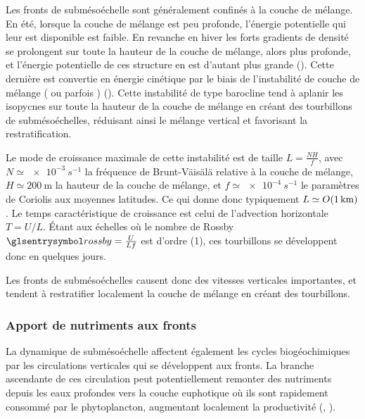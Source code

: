 Les fronts de submésoéchelle sont généralement confinés à la couche de mélange.
En été, lorsque la couche de mélange est peu profonde, l'énergie potentielle qui leur est disponible est faible.
En revanche en hiver les forts gradients de densité se prolongent sur toute la hauteur de la couche de mélange, alors plus profonde, et l'énergie potentielle de ces structure en est d'autant plus grande (\cite{mensa_2013,callies_2015,buckingham_2016,sasaki_2020}).
Cette dernière est convertie en énergie cinétique par le biais de l'instabilité de couche de mélange ( ou parfois ) (\cite{boccaletti_2007,fox-kemper_2008}).
Cette instabilité de type barocline tend à aplanir les isopycnes sur toute la hauteur de la couche de mélange en créant des tourbillons de submésoéchelles, réduisant ainsi le mélange vertical et favorisant la restratification.

\begin{note}
  Le mode de croissance maximale de cette instabilité est de taille \(L = \frac{NH}{f}\), avec \(N \simeq \qty{e-3}{s^{-1}}\) la fréquence de Brunt-Väisälä relative à la couche de mélange, \(H \simeq \qty{200}{\meter}\) la hauteur de la couche de mélange, et \(f \simeq \qty{e-4}{s^{-1}}\) le paramètres de Coriolis aux moyennes latitudes.
  Ce qui donne donc typiquement \(L \simeq \OM(\qty{1}{\km})\).
  Le temps caractéristique de croissance est celui de l'advection horizontale \(T = U/L\). Étant aux échelles où le nombre de Rossby \(\am{rossby} = \frac{U}{Lf}\) est d'ordre \OM(1), ces tourbillons se développent donc en quelques jours.
\end{note}

Les fronts de submésoéchelles causent donc des vitesses verticales importantes, et tendent à restratifier localement la couche de mélange en créant des tourbillons.

\subsubsection{Apport de nutriments aux fronts}
\label{sec:upwelling-nutriments}

La dynamique de submésoéchelle affectent également les cycles biogéochimiques par les circulations verticales qui se développent aux fronts.
La branche ascendante de ces circulation peut potentiellement remonter des nutriments depuis les eaux profondes vers la couche euphotique où ils sont rapidement consommé par le phytoplancton, augmentant localement la productivité (, \cite{klein_2009,calil_2011,mahadevan_2000,mahadevan_2016,mcwilliams_2016,levy_2001,levy_2012,levy_2018}).

